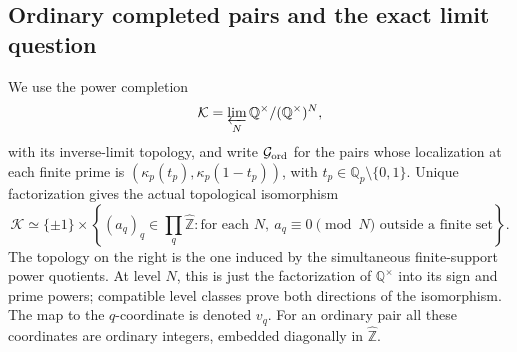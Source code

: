 \subsection{Ordinary completed pairs and the exact limit question}
We use the power completion
\[
 \mathcal K=\varprojlim_N\mathbb Q^\times/(\mathbb Q^\times)^N,
\]
with its inverse-limit topology, and write \(\mathcal G_{\rm ord}\)
for the pairs whose localization at each finite prime is
\((\kappa_p(t_p),\kappa_p(1-t_p))\), with
\(t_p\in\mathbb Q_p\setminus\{0,1\}\).
Unique factorization gives the actual topological isomorphism
\[
 \mathcal K\simeq\{\pm1\}\times
 \left\{(a_q)_q\in\prod_q\widehat{\mathbb Z}:
  \text{for each }N,\ a_q\equiv0\pmod N
  \text{ outside a finite set}\right\}.
\]
The topology on the right is the one induced by the simultaneous
finite-support power quotients. At level \(N\), this is just the
factorization of \(\mathbb Q^\times\) into its sign and prime
powers; compatible level classes prove both directions of the
isomorphism. The map to the \(q\)-coordinate is denoted \(v_q\).
For an ordinary pair all these coordinates are ordinary integers,
embedded diagonally in \(\widehat{\mathbb Z}\).

